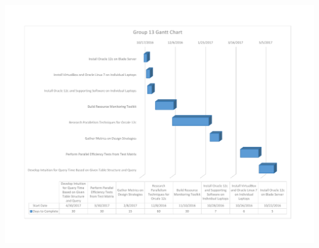 \documentclass[draftclsnofoot, onecolumn, compsoc, 10pt]{IEEEtran}
\begin{document}
\pagebreak

\includegraphics[width=\linewidth]{Gantt_Chart.pdf}
\end{document}
